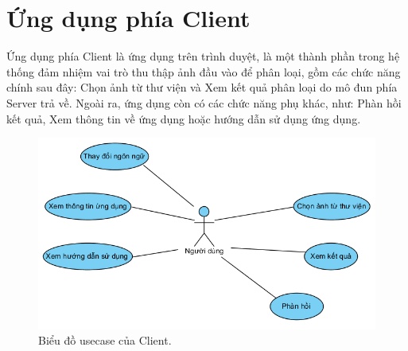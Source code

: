 \section{Ứng dụng phía Client}
Ứng dụng phía Client là ứng dụng trên trình duyệt, là một thành phần trong hệ thống đảm nhiệm vai trò thu thập ảnh đầu vào để phân loại, gồm các chức năng chính sau đây: Chọn ảnh từ thư viện và Xem kết quả phân loại do mô đun phía Server trả về. Ngoài ra, ứng dụng còn có các chức năng phụ khác, như: Phàn hồi kết quả, Xem thông tin về ứng dụng hoặc hướng dẫn sử dụng ứng dụng.
\begin{figure}[H]
	\centering
	\includegraphics[width=1\linewidth]{images/usecase_client}
	\caption{Biểu đồ usecase của Client.}
	\label{fig:usecase_client}
\end{figure}
